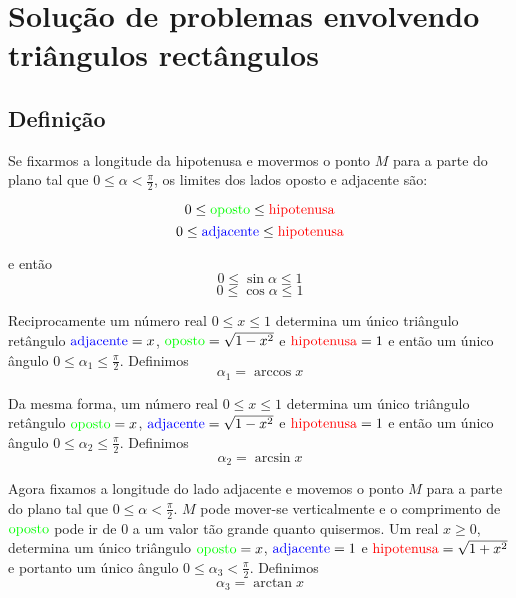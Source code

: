 \section{Solução de problemas envolvendo triângulos rectângulos}

\subsection{Definição}

Se fixarmos a longitude da hipotenusa e movermos o ponto $M$ para a parte
do plano tal que $0 \leq \alpha < \frac{\pi}{2}$,
os limites dos lados oposto e adjacente são:

$$0 \leq {\color{green}{\text{oposto}}} \leq {\color{red}{\text{hipotenusa}}}$$
$$0 \leq {\color{blue}{\text{adjacente}}} \leq {\color{red}{\text{hipotenusa}}}$$

\begin{center}
\end{center}

e então
$$
0\leq \sin \alpha \leq 1
$$
$$
0\leq \cos \alpha \leq 1
$$

Reciprocamente um número real $0 \leq x \leq 1$ determina um único triângulo
retângulo
${\color{blue}{\text{adjacente}}} = x$,
${\color{green}{\text{oposto}}} = \sqrt{1-x^2}$ e
${\color{red}{\text{hipotenusa}}} = 1$ e então um único ângulo
$0 \leq \alpha_1 \leq \frac{\pi}{2}$. Definimos
$$
\alpha_1 = \arccos x
$$

Da mesma forma, um número real $0 \leq x \leq 1$ determina um único triângulo
retângulo
${\color{green}{\text{oposto}}} = x$,
${\color{blue}{\text{adjacente}}} = \sqrt{1-x^2}$ e
${\color{red}{\text{hipotenusa}}} = 1$ e então um único ângulo
$0 \leq \alpha_2 \leq \frac{\pi}{2}$. Definimos
$$
\alpha_2 = \arcsin x
$$

Agora fixamos a longitude do lado adjacente e movemos o ponto $M$ para a parte
do plano tal que
$0 \leq \alpha < \frac{\pi}{2}$. $M$ pode mover-se
verticalmente e o comprimento de
${\color{green}{\text{oposto}}}$ pode ir de $0$ a um
valor tão grande quanto quisermos. Um real $x \geq 0$, determina um
único triângulo ${\color{green}{\text{oposto}}} = x$,
${\color{blue}{\text{adjacente}}} = 1$ e
${\color{red}{\text{hipotenusa}}} = \sqrt{1+x^2}$ e portanto um único
ângulo $0 \leq \alpha_3 < \frac{\pi}{2}$. Definimos
$$
\alpha_3 = \arctan x
$$

